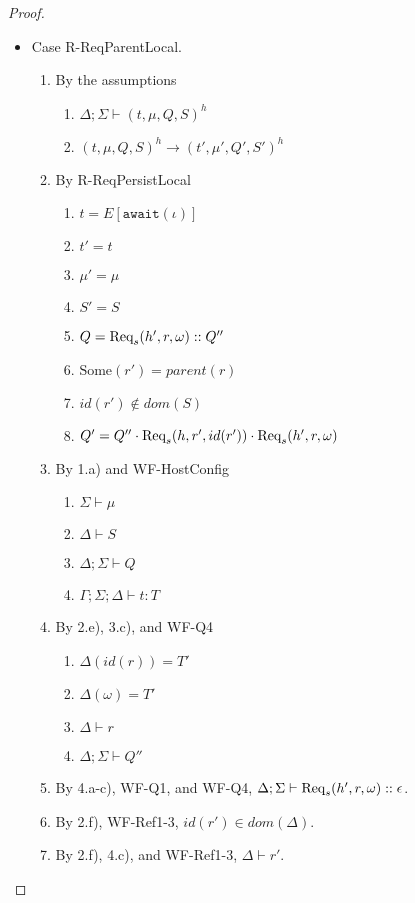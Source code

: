 \begin{proof}
\begin{itemize}
\item Case R-ReqParentLocal.
\begin{enumerate}
\item By the assumptions
  \begin{enumerate}[label=(\alph*)]
  \item $\Delta ; \Sigma \vdash (t, \mu, Q, S)^h$
  \item $(t, \mu, Q, S)^h \longrightarrow (t', \mu', Q', S')^h$
  \end{enumerate}
\item By R-ReqPersistLocal
  \begin{enumerate}[label=(\alph*)]
  \item $t = E[\texttt{await}(\iota)]$
  \item $t' = t$
  \item $\mu' = \mu$
  \item $S' = S$
  \item $Q = {\textrm{Req}_s(h', r, \omega)} :: Q''$  %
  \item $\text{Some}(r') = parent(r)$
  \item $id(r') \notin dom(S)$
  \item $Q' = Q'' \cdot {\textrm{Req}_s(h, r', id(r'))} \cdot {\textrm{Req}_s(h', r, \omega)}$
  \end{enumerate}
\item By 1.a) and WF-HostConfig
  \begin{enumerate}[label=(\alph*)]
  \item $\Sigma \vdash \mu$
  \item $\Delta \vdash S$
  \item $\Delta ; \Sigma \vdash Q$
  \item $\Gamma ; \Sigma ; \Delta \vdash t : T$
  \end{enumerate}
\item By 2.e), 3.c), and WF-Q4
  \begin{enumerate}[label=(\alph*)]
  \item $\Delta(id(r)) = T'$
  \item $\Delta(\omega) = T'$
  \item $\Delta \vdash r$
  \item $\Delta ; \Sigma \vdash Q''$
  \end{enumerate}
\item By 4.a-c), WF-Q1, and WF-Q4, $\Delta ; \Sigma \vdash {\textrm{Req}_s(h', r, \omega)} :: \epsilon$.
\item By 2.f), WF-Ref1-3, $id(r') \in dom(\Delta)$.
\item By 2.f), 4.c), and WF-Ref1-3, $\Delta \vdash r'$.

\end{enumerate}
\end{itemize}
\end{proof}

